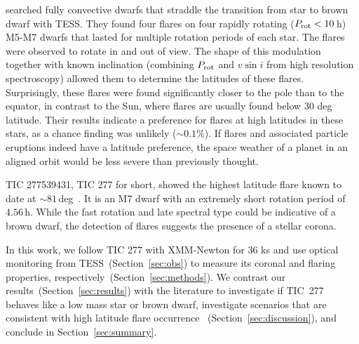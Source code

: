 \documentclass[twocolumn]{aastex631}
\begin{document}
\citet{ilin2021giant} searched fully convective dwarfs that straddle the transition from star to brown dwarf with TESS. They found four flares on four rapidly rotating ($P_{\rm rot}<10\,$h) M5-M7 dwarfs that lasted for multiple rotation periods of each star. The flares were observed to rotate in and out of view. The shape of this modulation together with known inclination (combining $P_{\rm rot}$ and $v \sin i$ from high resolution spectroscopy) allowed them to determine the latitudes of these flares. Surprisingly, these flares were found significantly closer to the pole than to the equator, in contrast to the Sun, where flares are usually found below 30 deg latitude. Their results indicate a preference for flares at high latitudes in these stars, as a chance finding was unlikely ($\sim 0.1\%$). If flares and associated particle eruptions indeed have a latitude preference, the space weather of a planet in an aligned orbit would be less severe than previously thought. %


TIC 277539431, TIC 277 for short, showed the highest latitude flare known to date at $\sim81\,$deg~\citep[][Table \ref{tab:starparams}]{ilin2021giant}. It is an M7 dwarf with an extremely short rotation period of $4.56\,$h. While the fast rotation and late spectral type could be indicative of a brown dwarf, the detection of flares suggests the presence of a stellar corona. %

In this work, we follow TIC 277 with XMM-Newton for 36 ks and use optical monitoring from TESS~(Section~\ref{sec:obs}) to measure its coronal and flaring properties, respectively~(Section~\ref{sec:methods}). We contrast our results~(Section~\ref{sec:results}) with the literature to investigate if TIC~277 behaves like a low mass star or brown dwarf, investigate scenarios that are consistent with high latitude flare occurrence ~(Section~\ref{sec:discussion}), and conclude in Section~\ref{sec:summary}.
\end{document}
